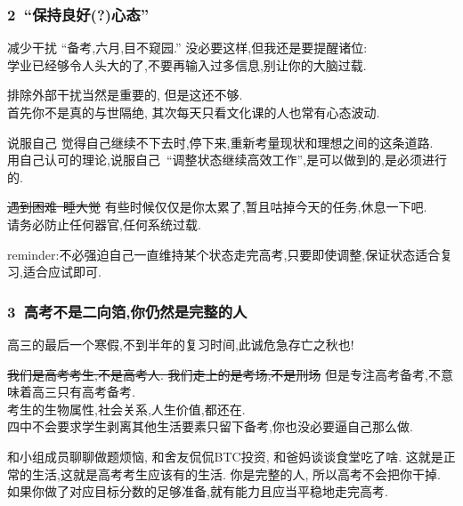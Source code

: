 \documentclass[10pt]{beamer}
\begin{document}
\begin{frame}
	\frametitle{2\ ``保持良好(?)心态''}

	\begin{block}{减少干扰}
		``备考,六月,目不窥园.'' 没必要这样,但我还是要提醒诸位:\\
		学业已经够令人头大的了,不要再输入过多信息,别让你的大脑过载.\\
	\end{block}

	\pause{} \vspace{0.3em}

	排除外部干扰当然是重要的, 但是这还不够.\\
	首先你不是真的与世隔绝, 其次每天只看文化课的人也常有心态波动.\\
	\pause{}

	\begin{block}{说服自己}
		觉得自己继续不下去时,停下来,重新考量现状和理想之间的这条道路.\\
		用自己认可的理论,说服自己\ ``调整状态继续高效工作'',是可以做到的,是必须进行的.\\
	\end{block}
	\pause{}
	\begin{block}{\sout{遇到困难\ 睡大觉}}
		有些时候仅仅是你太累了,暂且咕掉今天的任务,休息一下吧.\\
		请务必防止任何器官,任何系统过载.
	\end{block}
	reminder:\quad 不必强迫自己一直维持某个状态走完高考,只要即使调整,保证状态适合复习,适合应试即可.\\
\end{frame}

\begin{frame}
	\frametitle{3\ 高考不是二向箔,你仍然是完整的人}
	高三的最后一个寒假,不到半年的复习时间,此诚危急存亡之秋也!\\

	\pause{}
	\begin{block}{\sout{我们是高考考生,不是高考人. 我们走上的是考场,不是刑场}}
		但是专注高考备考,不意味着高三只有高考备考.\\
		考生的生物属性,社会关系,人生价值,都还在.\\
		四中不会要求学生剥离其他生活要素只留下备考,你也没必要逼自己那么做.\\
	\end{block}

	和小组成员聊聊做题烦恼, 和舍友侃侃BTC投资, 和爸妈谈谈食堂吃了啥.
	这就是正常的生活,这就是高考考生应该有的生活.
	\vspace{0.3em}
	你是完整的人, 所以高考不会把你干掉.\\
	如果你做了对应目标分数的足够准备,就有能力且应当平稳地走完高考.\\
	\vspace{1em} \pause{}
\end{frame}
\end{document}
